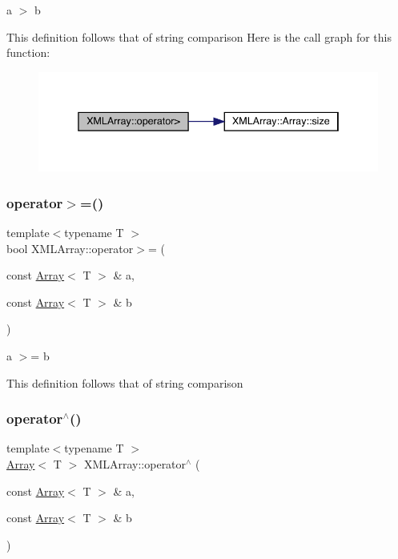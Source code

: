 a $>$ b 

This definition follows that of string comparison Here is the call graph for this function\+:
\nopagebreak
\begin{figure}[H]
\begin{center}
\leavevmode
\includegraphics[width=338pt]{dd/db1/namespaceXMLArray_ad9684cbf7b3089e446a523042d2818c1_cgraph}
\end{center}
\end{figure}
\mbox{\label{namespaceXMLArray_a77b282c1c52b2e07215ed808a0646e10}} 
\subsubsection{\texorpdfstring{operator$>$=()}{operator>=()}}
{\footnotesize\ttfamily template$<$typename T $>$ \\
bool X\+M\+L\+Array\+::operator$>$= (\begin{DoxyParamCaption}\item[{const \mbox{\hyperlink{classXMLArray_1_1Array}{Array}}$<$ T $>$ \&}]{a,  }\item[{const \mbox{\hyperlink{classXMLArray_1_1Array}{Array}}$<$ T $>$ \&}]{b }\end{DoxyParamCaption})\hspace{0.3cm}{\ttfamily [inline]}}



a $>$= b 

This definition follows that of string comparison \mbox{\label{namespaceXMLArray_a2aca927799841b80136c3d48bc8d3e29}} 
\subsubsection{\texorpdfstring{operator$^\wedge$()}{operator^()}}
{\footnotesize\ttfamily template$<$typename T $>$ \\
\mbox{\hyperlink{classXMLArray_1_1Array}{Array}}$<$ T $>$ X\+M\+L\+Array\+::operator$^\wedge$ (\begin{DoxyParamCaption}\item[{const \mbox{\hyperlink{classXMLArray_1_1Array}{Array}}$<$ T $>$ \&}]{a,  }\item[{const \mbox{\hyperlink{classXMLArray_1_1Array}{Array}}$<$ T $>$ \&}]{b }\end{DoxyParamCaption})\hspace{0.3cm}{\ttfamily [inline]}}




